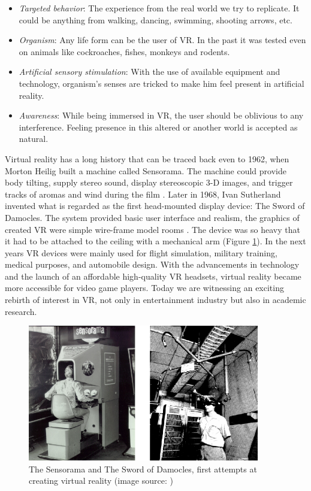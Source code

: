 \begin{itemize}
\item \textit{Targeted behavior}: The experience from the real world we try to replicate. It could be anything from walking, dancing, swimming, shooting arrows, etc.
\item \textit{Organism}: Any life form can be the user of VR. In the past it was tested even on animals like cockroaches, fishes, monkeys and rodents.
\item \textit{Artificial sensory stimulation}: With the use of available equipment and technology, organism’s senses are tricked to make him feel present in artificial reality.
\item \textit{Awareness}: While being immersed in VR, the user should be oblivious to any interference. Feeling presence in this altered or another world is accepted as natural.
\end{itemize}

Virtual reality has a long history that can be traced back even to 1962, when Morton Heilig built a machine called Sensorama. The machine could provide body tilting, supply stereo sound, display stereoscopic 3-D images, and trigger tracks of aromas and wind during the film \cite{SENSORAMA}. Later in 1968, Ivan Sutherland invented what is regarded as the first head-mounted display device: The Sword of Damocles. The system provided basic user interface and realism, the graphics of created VR were simple wire-frame model rooms \cite{DAMOCLES}. The device was so heavy that it had to be attached to the ceiling with a mechanical arm (Figure \ref{fig:FIRST_VR}). In the next years VR devices were mainly used for flight simulation, military training, medical purposes, and automobile design. With the advancements in technology and the launch of an affordable high-quality VR headsets, virtual reality became more accessible for video game players. Today we are witnessing an exciting rebirth of interest in VR, not only in entertainment industry but also in academic research.

\begin{figure}[th]
\centering
\includegraphics[width=0.9\textwidth]{img/first_vr.png}
\caption{The Sensorama and The Sword of Damocles, first attempts at creating virtual reality (image source: \cite{SENSORAMA_IMAGE}\cite{DAMOCLES})}
\label{fig:FIRST_VR}
\end{figure}

